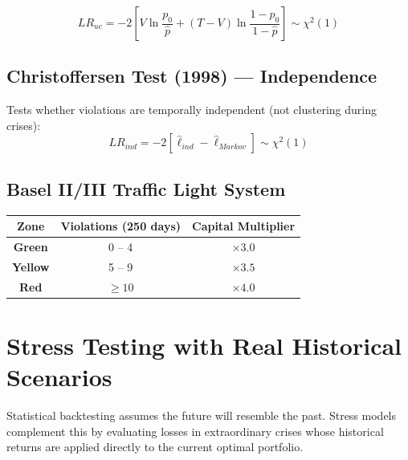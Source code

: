 \documentclass[11pt,a4paper]{article}
\begin{document}
\begin{equation}
    LR_{uc} = -2\left[V\ln\frac{p_0}{\hat{p}} + (T-V)\ln\frac{1-p_0}{1-\hat{p}}\right] \sim \chi^2(1)
\end{equation}

\subsection{Christoffersen Test (1998) — Independence}

Tests whether violations are temporally independent (not clustering during crises):
\begin{equation}
    LR_{ind} = -2\left[\hat{\ell}_{ind} - \hat{\ell}_{Markov}\right] \sim \chi^2(1)
\end{equation}

\subsection{Basel II/III Traffic Light System}

\begin{center}
\begin{tabular}{ccc}
\toprule
\rowcolor{lightgray}
\textbf{Zone} & \textbf{Violations (250 days)} & \textbf{Capital Multiplier} \\
\midrule
\cellcolor{successgreen!20}\textcolor{successgreen}{\textbf{Green}} & 0 -- 4 & $\times 3.0$ \\
\cellcolor{warnorange!20}\textcolor{warnorange}{\textbf{Yellow}} & 5 -- 9 & $\times 3.5$ \\
\cellcolor{dangerred!20}\textcolor{dangerred}{\textbf{Red}} & $\geq 10$ & $\times 4.0$ \\
\bottomrule
\end{tabular}
\end{center}

\section{Stress Testing with Real Historical Scenarios}

Statistical backtesting assumes the future will resemble the past. Stress models
complement this by evaluating losses in extraordinary crises whose historical returns
are applied directly to the current optimal portfolio.
\end{document}
